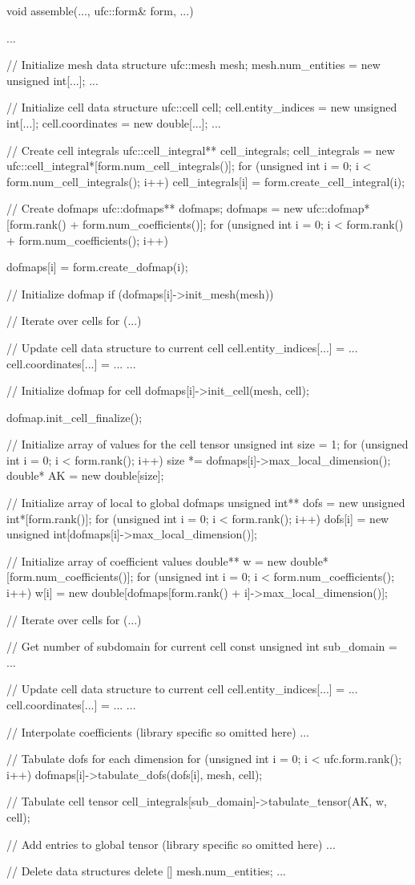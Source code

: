 \scriptsize
\begin{code}
void assemble(..., ufc::form& form, ...)
{
  ...

  // Initialize mesh data structure
  ufc::mesh mesh;
  mesh.num_entities = new unsigned int[...];
  ...

  // Initialize cell data structure
  ufc::cell cell;
  cell.entity_indices = new unsigned int[...];
  cell.coordinates = new double[...];
  ...

  // Create cell integrals
  ufc::cell_integral** cell_integrals;
  cell_integrals = new ufc::cell_integral*[form.num_cell_integrals()];
  for (unsigned int i = 0; i < form.num_cell_integrals(); i++)
    cell_integrals[i] = form.create_cell_integral(i);

  // Create dofmaps
  ufc::dofmaps** dofmaps;
  dofmaps = new ufc::dofmap*[form.rank() + form.num_coefficients()];
  for (unsigned int i = 0; i < form.rank() + form.num_coefficients(); i++)
  {
    dofmaps[i] = form.create_dofmap(i);

    // Initialize dofmap
    if (dofmaps[i]->init_mesh(mesh))
    {
      // Iterate over cells
      for (...)
      {
        // Update cell data structure to current cell
        cell.entity_indices[...] = ...
        cell.coordinates[...] = ...
        ...

        // Initialize dofmap for cell
        dofmaps[i]->init_cell(mesh, cell);
      }

      dofmap.init_cell_finalize();
    }
  }

  // Initialize array of values for the cell tensor
  unsigned int size = 1;
  for (unsigned int i = 0; i < form.rank(); i++)
    size *= dofmaps[i]->max_local_dimension();
  double* AK = new double[size];

  // Initialize array of local to global dofmaps
  unsigned int** dofs = new unsigned int*[form.rank()];
  for (unsigned int i = 0; i < form.rank(); i++)
    dofs[i] = new unsigned int[dofmaps[i]->max_local_dimension()];

  // Initialize array of coefficient values
  double** w = new double*[form.num_coefficients()];
  for (unsigned int i = 0; i < form.num_coefficients(); i++)
    w[i] = new double[dofmaps[form.rank() + i]->max_local_dimension()];

  // Iterate over cells
  for (...)
  {
    // Get number of subdomain for current cell
    const unsigned int sub_domain = ...

    // Update cell data structure to current cell
    cell.entity_indices[...] = ...
    cell.coordinates[...] = ...
    ...

    // Interpolate coefficients (library specific so omitted here)
    ...

    // Tabulate dofs for each dimension
    for (unsigned int i = 0; i < ufc.form.rank(); i++)
      dofmaps[i]->tabulate_dofs(dofs[i], mesh, cell);

    // Tabulate cell tensor
    cell_integrals[sub_domain]->tabulate_tensor(AK, w, cell);

    // Add entries to global tensor (library specific so omitted here)
    ...
  }

  // Delete data structures
  delete [] mesh.num_entities;
  ...
}
\end{code}
\normalsize
